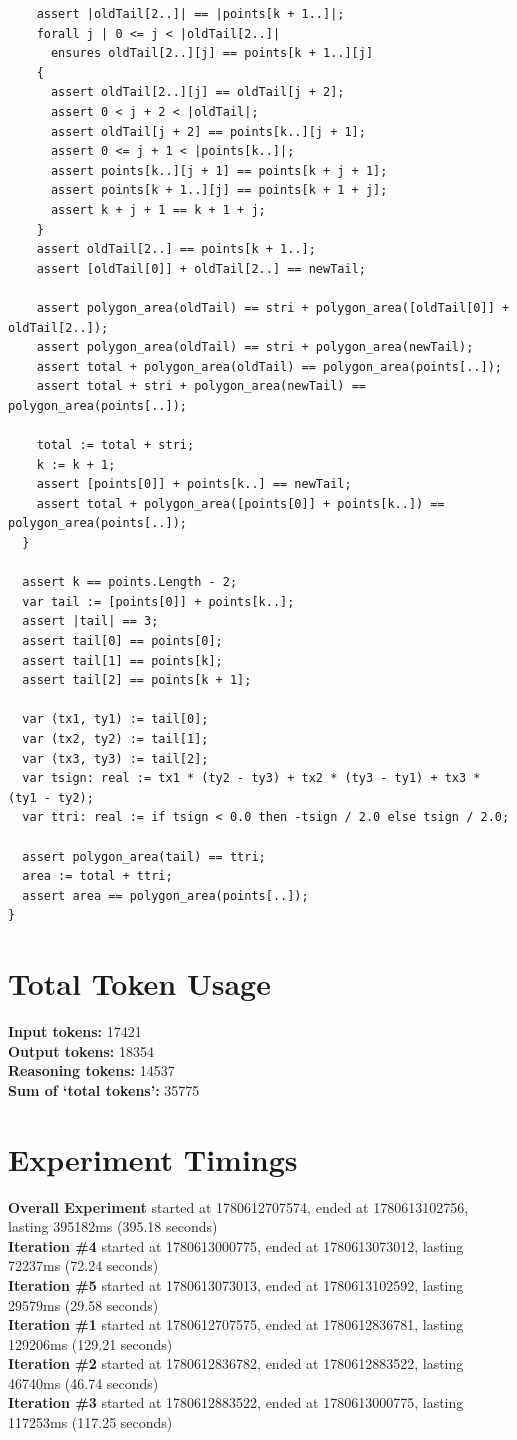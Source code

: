 \documentclass{article}
\begin{document}
\begin{lstlisting}
    assert |oldTail[2..]| == |points[k + 1..]|;
    forall j | 0 <= j < |oldTail[2..]|
      ensures oldTail[2..][j] == points[k + 1..][j]
    {
      assert oldTail[2..][j] == oldTail[j + 2];
      assert 0 < j + 2 < |oldTail|;
      assert oldTail[j + 2] == points[k..][j + 1];
      assert 0 <= j + 1 < |points[k..]|;
      assert points[k..][j + 1] == points[k + j + 1];
      assert points[k + 1..][j] == points[k + 1 + j];
      assert k + j + 1 == k + 1 + j;
    }
    assert oldTail[2..] == points[k + 1..];
    assert [oldTail[0]] + oldTail[2..] == newTail;

    assert polygon_area(oldTail) == stri + polygon_area([oldTail[0]] + oldTail[2..]);
    assert polygon_area(oldTail) == stri + polygon_area(newTail);
    assert total + polygon_area(oldTail) == polygon_area(points[..]);
    assert total + stri + polygon_area(newTail) == polygon_area(points[..]);

    total := total + stri;
    k := k + 1;
    assert [points[0]] + points[k..] == newTail;
    assert total + polygon_area([points[0]] + points[k..]) == polygon_area(points[..]);
  }

  assert k == points.Length - 2;
  var tail := [points[0]] + points[k..];
  assert |tail| == 3;
  assert tail[0] == points[0];
  assert tail[1] == points[k];
  assert tail[2] == points[k + 1];

  var (tx1, ty1) := tail[0];
  var (tx2, ty2) := tail[1];
  var (tx3, ty3) := tail[2];
  var tsign: real := tx1 * (ty2 - ty3) + tx2 * (ty3 - ty1) + tx3 * (ty1 - ty2);
  var ttri: real := if tsign < 0.0 then -tsign / 2.0 else tsign / 2.0;

  assert polygon_area(tail) == ttri;
  area := total + ttri;
  assert area == polygon_area(points[..]);
}
\end{lstlisting}
\section*{Total Token Usage}
\textbf{Input tokens: }17421
\\\textbf{Output tokens: }18354
\\\textbf{Reasoning tokens: }14537
\\\textbf{Sum of `total tokens': }35775
\section*{Experiment Timings}
\textbf{Overall Experiment} started at 1780612707574, ended at 1780613102756, lasting 395182ms (395.18 seconds)
\\\textbf{Iteration \#4} started at 1780613000775, ended at 1780613073012, lasting 72237ms (72.24 seconds)
\\\textbf{Iteration \#5} started at 1780613073013, ended at 1780613102592, lasting 29579ms (29.58 seconds)
\\\textbf{Iteration \#1} started at 1780612707575, ended at 1780612836781, lasting 129206ms (129.21 seconds)
\\\textbf{Iteration \#2} started at 1780612836782, ended at 1780612883522, lasting 46740ms (46.74 seconds)
\\\textbf{Iteration \#3} started at 1780612883522, ended at 1780613000775, lasting 117253ms (117.25 seconds)
\end{document}
